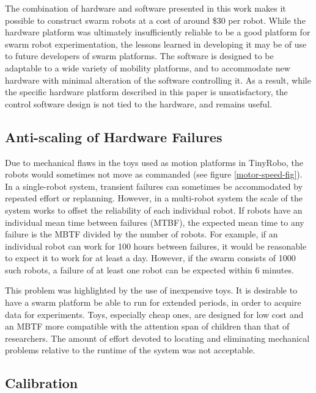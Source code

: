 \documentclass[]{article}
\begin{document}
The combination of hardware and software presented in this work makes it possible to construct swarm robots at a cost of around \$30 per robot. 
While the hardware platform was ultimately insufficiently reliable to be a good platform for swarm robot experimentation, the lessons learned in developing it may be of use to future developers of swarm platforms. 
The software is designed to be adaptable to a wide variety of mobility platforms, and to accommodate new hardware with minimal alteration of the software controlling it. 
As a result, while the specific hardware platform described in this paper is unsatisfactory, the control software design is not tied to the hardware, and remains useful.  

\subsection{Anti-scaling of Hardware Failures} \label{section:Anti_scaling_of_Hardware_Failures}

Due to mechanical flaws in the toys used as motion platforms in TinyRobo, the robots would sometimes not move as commanded (see figure \ref{motor-speed-fig}). 
In a single-robot system, transient failures can sometimes be accommodated by repeated effort or replanning. 
However, in a multi-robot system the scale of the system works to offset the reliability of each individual robot. 
If robots have an individual mean time between failures (MTBF), the expected mean time to any failure is the MBTF divided by the number of robots. 
For example, if an individual robot can work for 100 hours between failures, it would be reasonable to expect it to work for at least a day. 
However, if the swarm consists of 1000 such robots, a failure of at least one robot can be expected within 6 minutes. 

This problem was highlighted by the use of inexpensive toys. 
It is desirable to have a swarm platform be able to run for extended periods, in order to acquire data for experiments. 
Toys, especially cheap ones, are designed for low cost and an MBTF more compatible with the attention span of children than that of researchers. 
The amount of effort devoted to locating and eliminating mechanical problems relative to the runtime of the system was not acceptable.

\subsection{Calibration} \label{section:Calibration}
\end{document}

